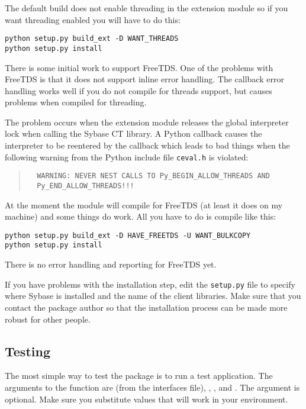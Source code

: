 The default build does not enable threading in the extension module so
if you want threading enabled you will have to do this:

\begin{verbatim}
python setup.py build_ext -D WANT_THREADS
python setup.py install
\end{verbatim}

There is some initial work to support FreeTDS.  One of the problems
with FreeTDS is that it does not support inline error handling.  The
callback error handling works well if you do not compile for threads
support, but causes problems when compiled for threading.

The problem occurs when the extension module releases the global
interpreter lock when calling the Sybase CT library.  A Python
callback causes the interpreter to be reentered by the callback which
leads to bad things when the following warning from the Python include
file \texttt{ceval.h} is violated:

\begin{quote}
\begin{verbatim}
  WARNING: NEVER NEST CALLS TO Py_BEGIN_ALLOW_THREADS AND
  Py_END_ALLOW_THREADS!!!
\end{verbatim}
\end{quote}

At the moment the module will compile for FreeTDS (at least it does
on my machine) and some things do work.  All you have to do is
compile like this:

\begin{verbatim}
python setup.py build_ext -D HAVE_FREETDS -U WANT_BULKCOPY
python setup.py install
\end{verbatim}

There is no error handling and reporting for FreeTDS yet.

If you have problems with the installation step, edit the
\texttt{setup.py} file to specify where Sybase is installed and the
name of the client libraries.  Make sure that you contact the package
author so that the installation process can be made more robust for
other people.

\subsection{Testing}

The most simple way to test the  package is to run a
test application.  The arguments to the 
function are  (from the interfaces file), ,
, and .  The  argument is
optional.  Make sure you substitute values that will work in your
environment.


